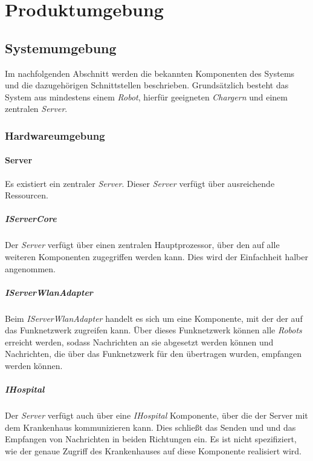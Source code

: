 \section{Produktumgebung}

  \subsection{Systemumgebung}
  Im nachfolgenden Abschnitt werden die bekannten Komponenten des Systems
  und die dazugehörigen Schnittstellen beschrieben. Grundsätzlich besteht
  das System aus mindestens einem \emph{Robot}, hierfür geeigneten
  \emph{Chargern} und einem zentralen \emph{Server}.

    \subsubsection{Hardwareumgebung}
    \paragraph{Server}\label{server}

    Es existiert ein zentraler \emph{Server}. Dieser \emph{Server} verfügt
    über ausreichende Ressourcen.

    \subparagraph{IServerCore}\label{iservercore}

    Der \emph{Server} verfügt über einen zentralen Hauptprozessor, über den
    auf alle weiteren Komponenten zugegriffen werden kann. Dies wird der
    Einfachheit halber angenommen.

    \subparagraph{IServerWlanAdapter}\label{iserverwlanadapter}

    Beim \emph{IServerWlanAdapter} handelt es sich um eine Komponente, mit der der 
    auf das Funknetzwerk zugreifen kann. Über dieses Funknetzwerk können alle
    \emph{Robots} erreicht werden, sodass Nachrichten an sie abgesetzt werden können
    und Nachrichten, die über das Funknetzwerk für den  übertragen wurden,
    empfangen werden können.

    \subparagraph{IHospital}\label{ihospital}

    Der \emph{Server} verfügt auch über eine \emph{IHospital} Komponente, über die
    der Server mit dem Krankenhaus kommunizieren kann. Dies schließt das Senden und
    und das Empfangen von Nachrichten in beiden Richtungen ein. Es ist nicht spezifiziert,
    wie der genaue Zugriff des Krankenhauses auf diese Komponente realisiert wird.

